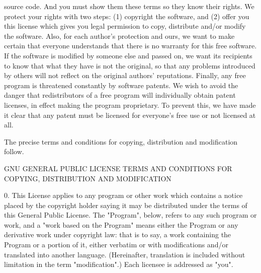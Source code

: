 \begin{DoxyCodeInclude}
\textcolor{stringliteral}{source code.  And you must show them these terms so they know their}
\textcolor{stringliteral}{rights.}
\textcolor{stringliteral}{}
\textcolor{stringliteral}{  We protect your rights with two steps: (1) copyright the software, and}
\textcolor{stringliteral}{(2) offer you this license which gives you legal permission to copy,}
\textcolor{stringliteral}{distribute and/or modify the software.}
\textcolor{stringliteral}{}
\textcolor{stringliteral}{  Also, for each author'}s protection and ours, we want to make certain
that everyone understands that there is no warranty \textcolor{keywordflow}{for} \textcolor{keyword}{this} free
software.  If the software is modified by someone \textcolor{keywordflow}{else} and passed on, we
want its recipients to know that what they have is not the original, so
that any problems introduced by others will not reflect on the original
authors\textcolor{stringliteral}{' reputations.}
\textcolor{stringliteral}{}
\textcolor{stringliteral}{  Finally, any free program is threatened constantly by software}
\textcolor{stringliteral}{patents.  We wish to avoid the danger that redistributors of a free}
\textcolor{stringliteral}{program will individually obtain patent licenses, in effect making the}
\textcolor{stringliteral}{program proprietary.  To prevent this, we have made it clear that any}
\textcolor{stringliteral}{patent must be licensed for everyone'}s free use or not licensed at all.

  The precise terms and conditions \textcolor{keywordflow}{for} copying, distribution and
modification follow.
                    
                    GNU GENERAL PUBLIC LICENSE
   TERMS AND CONDITIONS FOR COPYING, DISTRIBUTION AND MODIFICATION

  0. This License applies to any program or other work which contains
a notice placed by the copyright holder saying it may be distributed
under the terms of \textcolor{keyword}{this} General Public License.  The \textcolor{stringliteral}{"Program"}, below,
refers to any such program or work, and a \textcolor{stringliteral}{"work based on the Program"}
means either the Program or any derivative work under copyright law:
that is to say, a work containing the Program or a portion of it,
either verbatim or with modifications and/or translated into another
language.  (Hereinafter, translation is included without limitation in
the term \textcolor{stringliteral}{"modification"}.)  Each licensee is addressed as \textcolor{stringliteral}{"you"}.


\end{DoxyCodeInclude}
